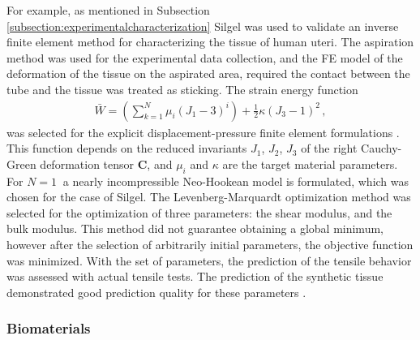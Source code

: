 For example, as mentioned in Subsection \ref{subsection:experimentalcharacterization} Silgel was used to validate an inverse
finite element method for characterizing the tissue of human uteri. The aspiration method was used for the experimental data collection, 
and the FE model of the deformation of the tissue on the aspirated area, required the contact 
between the tube and the tissue was treated as sticking. The strain energy function 
\begin{align}
        \bar{W} = (\sum_{k=1}^N \mu_i(J_1 - 3)^i) + \frac{1}{2}\kappa(J_3 - 1)^2 \,,
\end{align}
was selected for the explicit displacement-pressure finite element formulations \cite{Sussman1987}. 
This function depends on the reduced invariants $J_1$, $J_2$, $J_3$ of the right Cauchy-Green 
deformation tensor $\boldsymbol{C}$, and $\mu_i$ and $\kappa$ are the target material parameters. For $N = \SI{1}{}$ a nearly incompressible Neo-Hookean model 
is formulated, which was chosen for the case of Silgel. The Levenberg-Marquardt optimization method was selected for the optimization 
of three parameters: the shear modulus, and the bulk modulus. This method did not guarantee obtaining a global minimum, however after the selection of arbitrarily 
initial parameters, the objective function was minimized. With the set of parameters, the prediction of the tensile behavior was assessed with 
actual tensile tests. The prediction of the synthetic tissue demonstrated good prediction quality for these parameters \cite{Kauer2002}.

\subsubsection*{Biomaterials}

